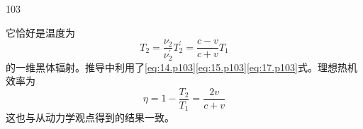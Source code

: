 \begin{solution}{103}
\begin{subsolution}
\begin{equation}
            \label{eq:18.p103}
        \end{equation}
        它恰好是温度为
        \begin{equation}
            T _ {2} = \frac {\nu_ {2}}{\nu_ {2} ^ {\prime}} T _ {2} ^ {\prime} = \frac {c - v}{c + v} T _ {1}
            \label{eq:19.p103}
        \end{equation}
        的一维黑体辐射。推导中利用了\eqref{eq:14.p103}\eqref{eq:15.p103}\eqref{eq:17.p103}式。理想热机效率为
        \begin{equation}
            \eta = 1 - \frac {T _ {2}}{T _ {1}} = \frac {2 v}{c + v}
            \label{eq:20.p103}
        \end{equation}
        这也与从动力学观点得到的结果一致。
    \end{subsolution}
\end{solution}